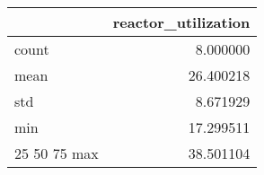 \begin{tabular}{lr}
\toprule
 & reactor\_utilization \\
\midrule
count & 8.000000 \\
mean & 26.400218 \\
std & 8.671929 \\
min & 17.299511 \\
25%
50%
75%
max & 38.501104 \\
\bottomrule
\end{tabular}

